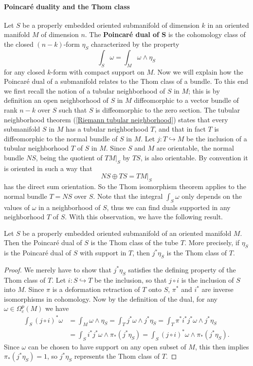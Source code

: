 \paragraph{Poincar\'e duality and the Thom class}
Let $S$ be a properly embedded oriented submanifold of dimension $k$ in an oriented manifold $M$ of dimension $n$. The \textbf{Poincar\'e dual of $\bm{S}$} is the 
cohomology class of the closed $(n-k)$-form $\eta_S$ characterized by the property
\[\int_S\omega=\int_M\omega\wedge\eta_S\]
for any closed $k$-form with compact support on $M$. Now we will explain how the Poincar\'e dual of a submanifold relates to the Thom class of a bundle. To this end we 
first recall the notion of a tubular neighborhood of $S$ in $M$; this is by definition an open neighborhood of $S$ in $M$ diffeomorphic to a vector bundle of rank $n-k$ 
over $S$ such that $S$ is diffeomorphic to the zero section. The tubular neighborhood theorem (\cref{Riemann tubular neighborhood}) states that every submanifold 
$S$ in $M$ has a tubular neighborhood $T$, and that in fact $T$ is diffeomorphic to the normal bundle of $S$ in $M$. Let $j:T\hookrightarrow M$ be the inclusion of a 
tubular neighborhood $T$ of $S$ in $M$. Since $S$ and $M$ are orientable, the normal bundle $NS$, being the quotient of $TM|_S$ by $TS$, is also orientable. By 
convention it is oriented in such a way that
\[NS\oplus TS=TM|_S\]
has the direct sum orientation. So the Thom isomorphism theorem applies to the normal bundle $T=NS$ over $S$. Note that the integral $\int_S\omega$ only depends on the 
values of $\omega$ in a neighborhood of $S$, thus we can find duals supported in any neighborhood $T$ of $S$. With this observation, we have the following result.
\begin{proposition}\label{Thom class Poincare dual}
Let $S$ be a properly embedded oriented submanifold of an oriented manifold $M$. Then the Poincar\'e dual of $S$ is the Thom class of the tube $T$. More precisely, if 
$\eta_S$ is the Poincar\'e dual of $S$ with support in $T$, then $j^*\eta_S$ is the Thom class of $T$.
\end{proposition}
\begin{proof}
We merely have to show that $j^*\eta_S$ satisfies the defining property of the Thom class of $T$. Let $i:S\hookrightarrow T$ be the inclusion, so that $j\circ i$ is the 
inclusion of $S$ into $M$. Since $\pi$ is a deformation retraction of $T$ onto $S$, $\pi^*$ and $i^*$ are inverse isomorphisms in cohomology. Now by the definition of 
the dual, for any $\omega\in\Omega^p_c(M)$ we have
\begin{align*}
\int_S(j\circ i)^*\omega&=\int_M\omega\wedge\eta_S=\int_Tj^*\omega\wedge j^*\eta_S=\int_T\pi^*i^*j^*\omega\wedge j^*\eta_S\\
&=\int_Si^*j^*\omega\wedge\pi_*(j^*\eta_S)=\int_S(j\circ i)^*\omega\wedge\pi_*(j^*\eta_S).
\end{align*}
Since $\omega$ can be chosen to have support on any open subset of $M$, this then implies $\pi_*(j^*\eta_S)=1$, so $j^*\eta_S$ represents the Thom class of $T$.
\end{proof}

